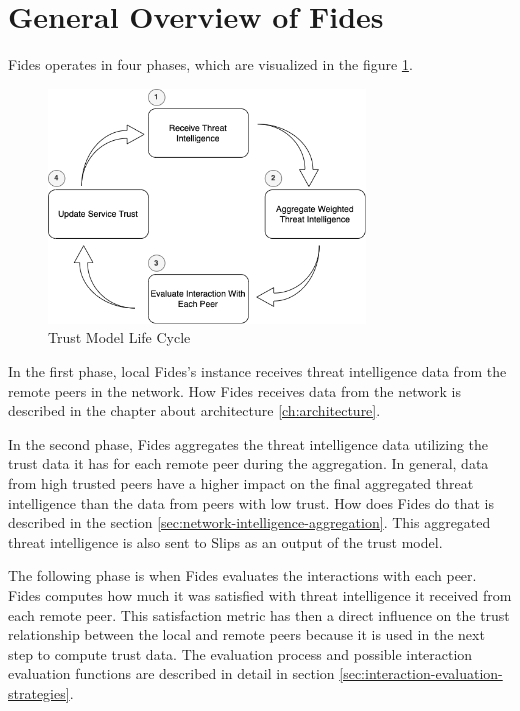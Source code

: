 \section{General Overview of Fides}
\label{sec:general-overview-of-fides}
Fides operates in four phases, which are visualized in the figure \ref{fig:trust-model-life-cycle}.

\begin{figure}[ht!]
    \centering
    \includegraphics[width=0.75\textwidth]{assets/service_trust_diagram.png}
    \caption{Trust Model Life Cycle}
    \label{fig:trust-model-life-cycle}
\end{figure}

In the first phase, local Fides's instance receives threat intelligence data from the remote peers in the network. 
How Fides receives data from the network is described in the chapter about architecture \ref{ch:architecture}.

In the second phase, Fides aggregates the threat intelligence data utilizing the trust data it has for each remote peer during the aggregation.
In general, data from high trusted peers have a higher impact on the final aggregated threat intelligence than the data from peers with low trust.
How does Fides do that is described in the section  \ref{sec:network-intelligence-aggregation}.
This aggregated threat intelligence is also sent to Slips as an output of the trust model.

The following phase is when Fides evaluates the interactions with each peer.
Fides computes how much it was satisfied with threat intelligence it received from each remote peer.
This satisfaction metric has then a direct influence on the trust relationship between the local and remote peers because it is used in the next step to compute trust data. 
The evaluation process and possible interaction evaluation functions are described in detail in section \ref{sec:interaction-evaluation-strategies}.

